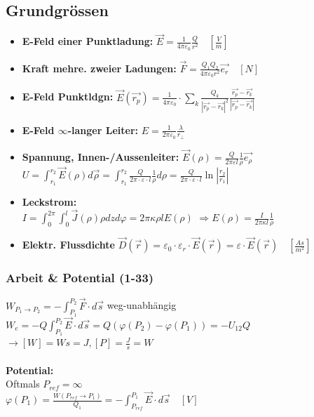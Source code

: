 \documentclass[a4paper, 6pt, landscape]{scrartcl}
\newcommand{\dis}[1]{\hspace{#1cm}}
\begin{document}
\begin{multicols*}{4}
	\subsection{Grundgrössen}
	\begin{itemize}
		\item \textbf{E-Feld einer Punktladung:} $\vec{E}=\frac{1}{4\pi\varepsilon_0}\frac{Q}{r^2} \quad [\frac{V}{m}]$
		\item \textbf{Kraft mehre. zweier Ladungen:} $\vec{F}=\frac{Q_1Q_2}{4\pi\varepsilon_0r^2}\vec{e_r} \quad [N]$
		\item \textbf{E-Feld Punktldgn:}
		      $\vec{E}(\vec{r_p})=\frac{1}{4\pi\varepsilon_0}\cdot\sum_k\frac{Q_k}{|\vec{r_p}-\vec{r_k}|^2}\frac{\vec{r_p}-\vec{r_k}}{|\vec{r_p}-\vec{r_k}|}$
		\item \textbf{E-Feld $\infty$-langer Leiter:} $E=\frac{1}{2\pi\varepsilon_0}\frac{\lambda}{r_\bot}$
		\item \textbf{Spannung, Innen-/Aussenleiter:} $\vec{E}(\rho)=\frac{Q}{2\pi\varepsilon l}\frac{1}{\rho}\vec{e_{\rho}}$\\
		      $\displaystyle{U=\int_{r_1}^{r_2}{\vec{E}(\rho)}d\vec{\rho}=\int_{r_1}^{r_2}{\frac{Q}{2\pi\cdot\varepsilon\cdot l}\frac{1}{\rho}}d\rho}=\frac{Q}{2\pi\cdot\varepsilon\cdot l}\ln{\left| \frac{r_2}{r_1} \right|}$\\
		\item \textbf{Leckstrom:}
		      \\ $\displaystyle{I=\int_{0}^{2\pi}{\int_{0}^{l}{\vec{J}(\rho)\rho}dz}d\varphi=2\pi\kappa\rho
		      	l E(\rho)}$  $\Rightarrow E(\rho)=\frac{I}{2\pi\kappa l}\frac{1}{\rho}$
		\item \textbf{Elektr. Flussdichte }$\vec{D}(\vec{r})=\varepsilon_0\cdot\varepsilon_r\cdot\vec{E}(\vec{r})=\varepsilon\cdot\vec{E}(\vec{r})\quad [\frac{As}{m^2}]$
	\end{itemize}

	\subsubsection{Arbeit \& Potential (1-33)}
	$W_{P_1\rightarrow P_2}=-\int_{P_1}^{P_2}{\vec{F}\cdot}d\vec{s}$ \dis{0.5} weg-unabhängig\\
	$W_{e}=-Q\int_{P_1}^{P_2}{\vec{E}\cdot}d\vec{s}=Q\left(\varphi(P_2)-\varphi(P_1)\right)=-U_{12}Q$\\
	$\rightarrow [W]=Ws=J, [P]=\frac{J}{s}=W$\\ \\
	\textbf{Potential:}\\
	Oftmals $P_{ref}=\infty$\\
	$\varphi(P_1)=\frac{W(P_{ref}\rightarrow P_1)}{Q_1}=-\int_{P_{ref}}^{P_1}{\vec{E}\cdot}d\vec{s} \quad [V]$

\end{multicols*}
\end{document}
